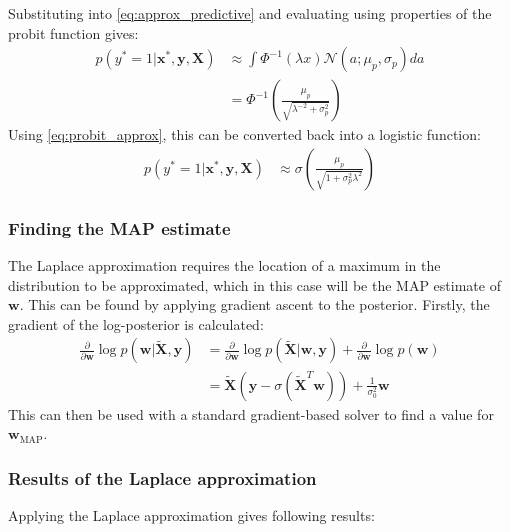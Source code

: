 \documentclass[a4paper]{article}
\begin{document}
    Substituting into \autoref{eq:approx_predictive} and evaluating using properties of the probit function gives:
    \begin{align}
         p(y^* = 1 | \bm{x}^*, \bm{y}, \bm{X}) &\approx \int \Phi^{-1}(\lambda x) \mathcal{N}(a; \mu_p, \sigma_p) da \nonumber \\
        &= \Phi^{-1}\left(\frac{\mu_p}{\sqrt{\lambda^{-2} + \sigma_p^2}}\right)
     \end{align}
    Using \autoref{eq:probit_approx}, this can be converted back into a logistic function:
    \begin{align}
        \label{eq:predictive_distribution}
         p(y^* = 1 | \bm{x}^*, \bm{y}, \bm{X}) &\approx \sigma\left(\frac{\mu_p}{\sqrt{1 + \sigma_p^2\lambda^2}}\right)
    \end{align}


























    
    \subsubsection{Finding the MAP estimate}
    The Laplace approximation requires the location of a maximum in the distribution to be approximated, which in this case will be the MAP estimate of $\bm{w}$.
    This can be found by applying gradient ascent to the posterior.
    Firstly, the gradient of the log-posterior is calculated:
    \begin{align}
        \frac{\partial}{\partial \bm{w}} \log p(\bm{w} | \tilde{\bm{X}}, \bm{y}) &= \frac{\partial}{\partial \bm{w}} \log p(\tilde{\bm{X}} | \bm{w} , \bm{y}) + \frac{\partial}{\partial \bm{w}} \log p(\bm{w}) \nonumber \\
        &= \tilde{\bm{X}} (\textbf{y} - \sigma(\tilde{\bm{X}}^T \bm{w})) + \frac{1}{\sigma_0^2} \bm{w}
    \end{align}
    This can then be used with a standard gradient-based solver to find a value for $\bm{w}_\text{MAP}$.
    \subsubsection{Results of the Laplace approximation}
    Applying the Laplace approximation gives following results:
\end{document}
